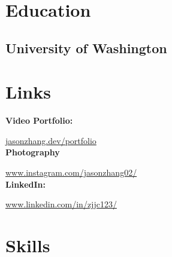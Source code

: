\documentclass[]{main}
\begin{document}
%
%

%
%

%
%

\begin{minipage}[t]{0.33\textwidth} 


\section{Education} 

\subsection{University of Washington}
\sectionsep




\section{Links} 
\textbf{Video Portfolio:} 

\href{https://jasonzhang.dev/portfolio}{jasonzhang.dev/portfolio} \\

\textbf{Photography}

\href{https://www.instagram.com/jasonzhang02/}{www.instagram.com/jasonzhang02/} \\

\textbf{LinkedIn:} 

\href{https://www.linkedin.com/in/zjjc123/}{www.linkedin.com/in/zjjc123/} \\


\section{Skills}


\end{minipage}
\end{document}
